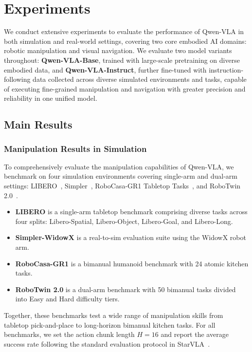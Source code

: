 \documentclass{article}
\begin{document}
\section{Experiments}


We conduct extensive experiments to evaluate the performance of Qwen-VLA in both simulation and real-world settings, covering two core embodied AI domains: robotic manipulation and visual navigation. We evaluate two model variants throughout: \textbf{Qwen-VLA-Base}, trained with large-scale pretraining on diverse embodied data, and \textbf{Qwen-VLA-Instruct}, further fine-tuned with instruction-following data collected across diverse simulated environments and tasks, capable of executing fine-grained manipulation and navigation with greater precision and reliability in one unified model.                                     


\subsection{Main Results}

\subsubsection{Manipulation Results in Simulation}

To comprehensively evaluate the manipulation capabilities of Qwen-VLA, we benchmark on four simulation environments covering single-arm and dual-arm settings: LIBERO~\citep{liu2023libero}, Simpler~\citep{li2024simpler}, RoboCasa-GR1 Tabletop Tasks~\citep{nasiriany2024robocasa}, and RoboTwin 2.0~\citep{mu2025robotwin}. 


\begin{itemize}[leftmargin=*,itemsep=2pt]
\item \textbf{LIBERO} is a single-arm tabletop benchmark comprising diverse tasks across four splits: Libero-Spatial, Libero-Object, Libero-Goal, and Libero-Long.

\item \textbf{Simpler-WidowX} is a real-to-sim evaluation suite using the WidowX robot arm. 

\item \textbf{RoboCasa-GR1} is a bimanual humanoid benchmark with 24 atomic kitchen tasks. 

\item \textbf{RoboTwin 2.0} is a dual-arm benchmark with 50 bimanual tasks divided into Easy and Hard difficulty tiers.
\end{itemize}
Together, these benchmarks test a wide range of manipulation skills from tabletop pick-and-place to long-horizon bimanual kitchen tasks. For all benchmarks, we set the action chunk length $H=16$ and report the average success rate following the standard evaluation protocol in StarVLA~\citep{community2026starvla}.
\end{document}
